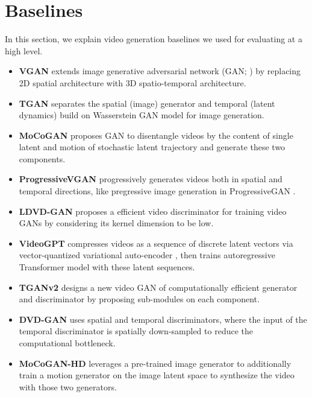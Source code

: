 \documentclass{article} \usepackage{iclr2022_conference,times}
\begin{document}
 \section{Baselines}
\label{appen:baselines}
In this section,
we explain video generation baselines we used for evaluating \sname at a high level. 
\begin{itemize}[leftmargin=0.2in]
\item \textbf{VGAN} \citep{vondrick2016generating} extends image generative adversarial network (GAN; \citep{goodfellow2014generative}) by replacing 2D spatial architecture with 3D spatio-temporal architecture.

\item \textbf{TGAN} \citep{saito2017temporal} separates the spatial (image) generator and temporal (latent dynamics) build on Wasserstein GAN \citep{arjovsky2017wasserstein} model for image generation. 

\item \textbf{MoCoGAN} \citep{tulyakov2018mocogan} proposes GAN to disentangle videos by the content of single latent and motion of stochastic latent trajectory and generate these two components.

\item \textbf{ProgressiveVGAN} \citep{acharya2018towards} progressively generates videos both in spatial and temporal directions, like pregressive image generation in ProgressiveGAN \citep{karras2017progressive}.

\item \textbf{LDVD-GAN} \citep{kahembwe2020lower} proposes a efficient video discriminator for training video GANs by considering its kernel dimension to be low.

\item \textbf{VideoGPT} \citep{yan2021videogpt} compresses videos as a sequence of discrete latent vectors via vector-quantized variational auto-encoder \citep{van2017neural}, then trains autoregressive Transformer model \citep{vaswani2017attention} with these latent sequences.

\item \textbf{TGANv2} \citep{saito2020train} designs a new video GAN of computationally efficient generator and discriminator by proposing sub-modules on each component.

\item \textbf{DVD-GAN} \citep{clark2019adversarial} uses spatial and temporal discriminators, where the input of the temporal discriminator is spatially down-sampled to reduce the computational bottleneck.
 

\item \textbf{MoCoGAN-HD} \citep{tian2021good} leverages a pre-trained image generator to additionally train a motion generator on the image latent space to synthesize the video with those two generators.
\end{itemize}
\end{document}
